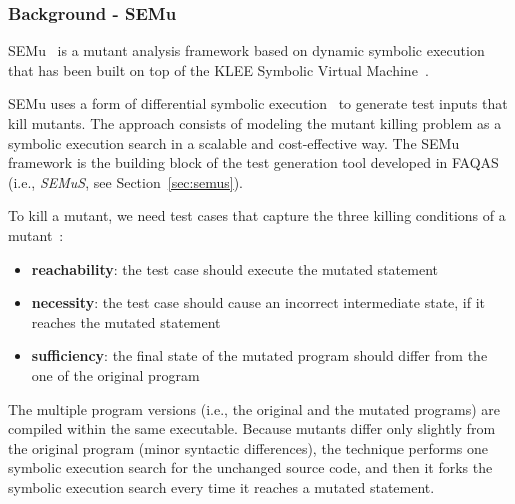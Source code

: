
\subsubsection{Background - SEMu}
\label{klee-semu}

\STARTCHANGEDWPT

SEMu~\cite{chekam2021killing} is a mutant analysis  framework based on dynamic symbolic execution that has been built on top of the KLEE Symbolic Virtual Machine~\cite{cadar2008klee}.

SEMu uses a form of differential symbolic execution~\cite{person2008differential} to generate test inputs that kill mutants. The approach consists of modeling the mutant killing problem as a symbolic execution search in a scalable and cost-effective way. 
The SEMu framework is the building block of 
the test generation tool developed in FAQAS (i.e., \emph{SEMuS}, see Section~\ref{sec:semus}).

To kill a mutant, we need test cases that capture the three killing conditions of a mutant~\cite{offutt1997automatically}: 
\begin{itemize}
	\item \textbf{reachability}: the test case should execute the mutated statement
	\item \textbf{necessity}: the test case should cause an incorrect intermediate state, if it reaches the mutated statement
	\item \textbf{sufficiency}: the final state of the mutated program should differ from the one of the original program
\end{itemize}


The multiple program versions (i.e., the original and the mutated programs) are compiled within the same executable. 
Because mutants differ only slightly from the original program (minor syntactic differences), the technique performs one symbolic execution search for the unchanged source code, and then it forks the symbolic execution search every time it reaches a mutated statement.



